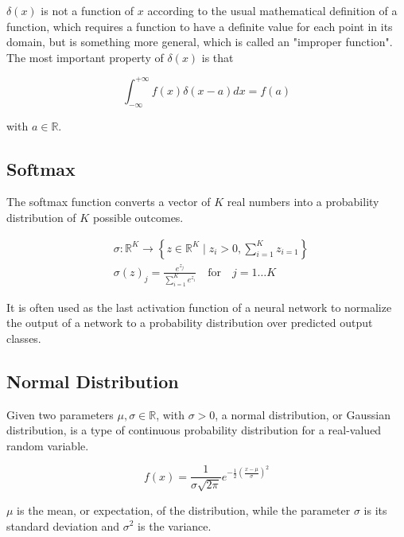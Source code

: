 \noindent $\delta(x)$ is not a function of $x$ according to the usual mathematical definition of a function, which requires a function to have a definite value for each point in its domain, but is something more general, which is called an "improper function". \\
The most important property of $\delta(x)$ is that

\begin{equation}
    \int_{-\infty}^{+\infty} f(x)\delta(x-a) d x=f(a)
\end{equation}

\noindent with $a\in\mathbb{R}$.

\subsection{Softmax}\label{ch:Softmax}
The softmax function converts a vector of $K$ real numbers into a probability distribution of $K$ possible outcomes.

\begin{equation}
    \begin{aligned} 
    & \sigma: \mathbb{R}^{K} \rightarrow\left\{z \in \mathbb{R}^{K} \mid z_{i}>0, \sum_{i=1}^{K} z_{i=1}\right\} \\ 
    & \sigma(z)_{j}=\frac{e^{z_{j}}}{\sum_{i=1}^{K} e^{z_{i}}} \quad \text{for}\quad j=1 \ldots K
    \end{aligned}
\end{equation}

\noindent It is often used as the last activation function of a neural network to normalize the output of a network to a probability distribution over predicted output classes.

\subsection{Normal Distribution}
Given two parameters $\mu,\sigma \in \mathbb{R}$, with $\sigma>0$, a normal distribution, or Gaussian distribution, is a type of continuous probability distribution for a real-valued random variable.

\begin{equation}
    f(x)=\frac{1}{\sigma \sqrt{2 \pi}} e^{-\frac{1}{2}\left(\frac{x-\mu}{\sigma}\right)^{2}}
\end{equation}

\noindent $\mu$ is the mean, or expectation, of the distribution, while the parameter $\sigma$ is its standard deviation and $\sigma^2$ is the variance.


